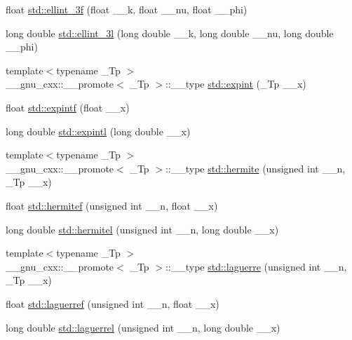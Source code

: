 \begin{DoxyCompactItemize}
\item 
float \hyperlink{group__tr29124__math__spec__func_ga1a80bd2c15bc9fbecda2630a9e9409e7}{std\+::ellint\+\_\+3f} (float \+\_\+\+\_\+k, float \+\_\+\+\_\+nu, float \+\_\+\+\_\+phi)
\item 
long double \hyperlink{group__tr29124__math__spec__func_gaa8c0e5864df8769021a7f3e21a30c5d2}{std\+::ellint\+\_\+3l} (long double \+\_\+\+\_\+k, long double \+\_\+\+\_\+nu, long double \+\_\+\+\_\+phi)
\item 
{\footnotesize template$<$typename \+\_\+\+Tp $>$ }\\\+\_\+\+\_\+gnu\+\_\+cxx\+::\+\_\+\+\_\+promote$<$ \+\_\+\+Tp $>$\+::\+\_\+\+\_\+type \hyperlink{group__tr29124__math__spec__func_ga88ba17f5d050a6973ca4db1bf6e90590}{std\+::expint} (\+\_\+\+Tp \+\_\+\+\_\+x)
\item 
float \hyperlink{group__tr29124__math__spec__func_ga5842816f6eed2594e0a327df4e4a2a47}{std\+::expintf} (float \+\_\+\+\_\+x)
\item 
long double \hyperlink{group__tr29124__math__spec__func_ga1329130b32328d0666e290ee5931fa4f}{std\+::expintl} (long double \+\_\+\+\_\+x)
\item 
{\footnotesize template$<$typename \+\_\+\+Tp $>$ }\\\+\_\+\+\_\+gnu\+\_\+cxx\+::\+\_\+\+\_\+promote$<$ \+\_\+\+Tp $>$\+::\+\_\+\+\_\+type \hyperlink{group__tr29124__math__spec__func_ga97632b8bf77c323b2369e8d327965bdf}{std\+::hermite} (unsigned int \+\_\+\+\_\+n, \+\_\+\+Tp \+\_\+\+\_\+x)
\item 
float \hyperlink{group__tr29124__math__spec__func_ga94dae7444bb349e33057a92932db8abe}{std\+::hermitef} (unsigned int \+\_\+\+\_\+n, float \+\_\+\+\_\+x)
\item 
long double \hyperlink{group__tr29124__math__spec__func_ga21f8e312ee3e65286f86bf141b0f32e0}{std\+::hermitel} (unsigned int \+\_\+\+\_\+n, long double \+\_\+\+\_\+x)
\item 
{\footnotesize template$<$typename \+\_\+\+Tp $>$ }\\\+\_\+\+\_\+gnu\+\_\+cxx\+::\+\_\+\+\_\+promote$<$ \+\_\+\+Tp $>$\+::\+\_\+\+\_\+type \hyperlink{group__tr29124__math__spec__func_gacae65579b397fddcd27954380d364a58}{std\+::laguerre} (unsigned int \+\_\+\+\_\+n, \+\_\+\+Tp \+\_\+\+\_\+x)
\item 
float \hyperlink{group__tr29124__math__spec__func_gada763419b0e21b38e38daa8b6eb56a8c}{std\+::laguerref} (unsigned int \+\_\+\+\_\+n, float \+\_\+\+\_\+x)
\item 
long double \hyperlink{group__tr29124__math__spec__func_gaaf8b141edf9163b37ea4f2ed3e0191fc}{std\+::laguerrel} (unsigned int \+\_\+\+\_\+n, long double \+\_\+\+\_\+x)

\end{DoxyCompactItemize}
